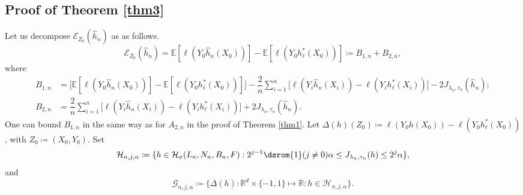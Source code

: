 \documentclass[10pt,twoside]{article}
\numberwithin{equation}{section}
\newcommand{\E}{\ensuremath{\mathbb{E}}}
\newcommand{\R}{\ensuremath{\mathbb{R}}}
\def \ind{\textrm{\dsrom{1}}}
\begin{document}
\subsection{Proof of Theorem \ref{thm3}}
% 
%
Let us decompose $ \mathcal{E}_ {Z_0} (\widehat{h}_n) $ as as follows.
%
\begin{equation}
\mathcal{E}_{Z_0} (\widehat{h}_n)  = \E [ \ell (Y_0 \widehat{h}_n (X_0)) ] -  \E [ \ell (Y_0 h^{*}_{\ell} (X_0)) ]  \coloneqq B_ {1, n} + B_ {2, n},
\end{equation}
%
where 
%
\begin{align}
\nonumber B_ {1, n} & =  \Big[  \E [ \ell (Y_0 \widehat{h}_n (X_0)) ] -  \E [ \ell (Y_0 h^{*}_{\ell} (X_0)) ] \Big]  -  \dfrac{2}{n} \sum_{i=1}^n   \Big[  \ell(Y_i \widehat{h}_n (X_i)) -  \ell(Y_i h^{*}_{\ell} (X_i)) \Big] - 2 J_{\lambda_n, \tau_n}(\widehat{h}_n ); 
\\
\nonumber  B_ {2, n} & = \dfrac{2}{n} \sum_{i=1}^n  \Big[  \ell (Y_i \widehat{h}_n (X_i)) -  \ell (Y_i h^{*}_{\ell} (X_i)) \Big] + 2 J_{\lambda_n, \tau_n}(\widehat{h}_n). 
\end{align}
%
One can bound $ B_{1, n} $ in the same way as for $ A_{2, n} $ in the proof of Theorem \ref{thm1}. Let
%
$ \Delta (h) (Z_0) \coloneqq  \ell (Y_0  h (X_0)) - \ell (Y_0  h^*_\ell (X_0)) $, with $ Z_0 \coloneqq (X_0, Y_0) $. 
%
Set
%
\begin{equation*}
\mathcal{H}_ {n, j, \alpha} \coloneqq \{ h \in  \mathcal{H}_ {\sigma} (L_n, N_n, B_n, F): 2^ {j -1} \ind{( j \ne 0)} \alpha \leq J_ {\lambda_n, \tau_n} (h) \leq 2^j \alpha  \},
\end{equation*}
%
and 
%
\begin{equation}
\mathcal{G}_{n, j, \alpha} \coloneqq \Big\{ \Delta (h): \R^d \times \{ -1, 1 \} \mapsto \R: h \in \mathcal{H}_{n, j, \alpha} \Big\}.
\end{equation}
\end{document}
